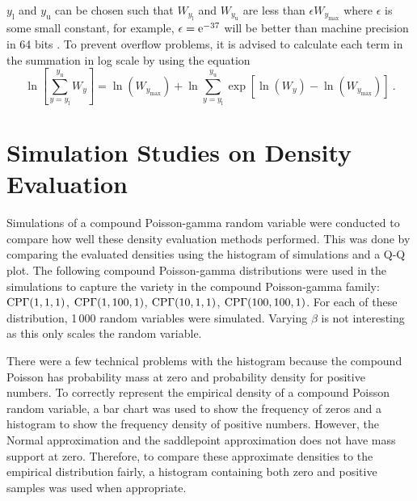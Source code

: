 $y_\text{l}$ and $y_\text{u}$ can be chosen such that $W_{y_\text{l}}$ and $W_{y_\text{u}}$ are less than $\epsilon W_{y_\text{max}}$ where $\epsilon$ is some small constant, for example, $\epsilon=\mathrm{e}^{-37}$ will be better than machine precision in 64 bits \citep{dunn2005series}. To prevent overflow problems, it is advised to calculate each term in the summation in log scale \citep{dunn2005series} by using the equation
\begin{equation}
  \ln\left[
    \sum_{y=y_\text{l}}^{y_\text{u}}W_y
  \right]
  = 
  \ln\left(
    W_{y_\text{max}}
  \right)
  +\ln\sum_{y=y_\text{l}}^{y_\text{u}}
  \exp\left[
    \ln\left(W_y\right)-\ln\left(W_{y_\text{max}}\right)
  \right]
  \ .
\end{equation}

\section{Simulation Studies on Density Evaluation}

Simulations of a compound Poisson-gamma random variable were conducted to compare how well these density evaluation methods performed. This was done by comparing the evaluated densities using the histogram of simulations and a Q-Q plot. The following compound Poisson-gamma distributions were used in the simulations to capture the variety in the compound Poisson-gamma family: $\operatorname{CP\Gamma}(1,1,1)$, $\operatorname{CP\Gamma}(1,100,1)$, $\operatorname{CP\Gamma}(10,1,1)$, $\operatorname{CP\Gamma}(100,100,1)$. For each of these distribution, 1\,000 random variables were simulated. Varying $\beta$ is not interesting as this only scales the random variable.

There were a few technical problems with the histogram because the compound Poisson has probability mass at zero and probability density for positive numbers. To correctly represent the empirical density of a compound Poisson random variable, a bar chart was used to show the frequency of zeros and a histogram to show the frequency density of positive numbers. However, the Normal approximation and the saddlepoint approximation does not have mass support at zero. Therefore, to compare these approximate densities to the empirical distribution fairly, a histogram containing both zero and positive samples was used when appropriate.

